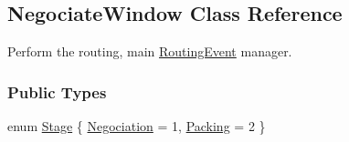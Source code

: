 \hypertarget{classKite_1_1NegociateWindow}{}\subsection{Negociate\+Window Class Reference}
\label{classKite_1_1NegociateWindow}


Perform the routing, main \hyperlink{classKite_1_1RoutingEvent}{Routing\+Event} manager.  


\subsubsection*{Public Types}
\begin{DoxyCompactItemize}
\item 
enum \hyperlink{classKite_1_1NegociateWindow_aca8133200c1122e29b87b314d82604eb}{Stage} \{ \newline
\hyperlink{classKite_1_1NegociateWindow_aca8133200c1122e29b87b314d82604eba19ccda3133337a5db697480ebfd6097f}{Negociation} = 1, 
\newline
\hyperlink{classKite_1_1NegociateWindow_aca8133200c1122e29b87b314d82604ebabdd3263d9492edf336ac52b4a9776b82}{Packing} = 2
 \}
\end{DoxyCompactItemize}

